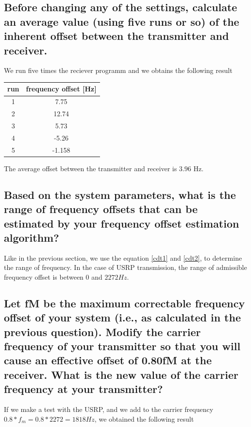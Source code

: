 \documentclass[frenchb, oneside, headings=normal]{scrartcl}
\begin{document}
\subsection{Before changing any of the settings, calculate an average value (using five runs or so) of the inherent offset between the transmitter and receiver.}

We run five times the reciever programm and we obtains the following result 
\begin{center}
	\begin{tabular}{c|c}
		run & frequency offset [\si{\hertz}]\\
		\hline
		1 & 7.75\\
		2 & 12.74\\
		3 & 5.73\\
		4 & -5.26\\
		5 & -1.158\\
	\end{tabular}
\end{center}
The average offset between the transmitter and receiver is $3.96$ \si{\hertz}. 


\subsection{Based on the system parameters, what is the range of frequency offsets that can be estimated by your frequency offset estimation algorithm?}

Like in the previous section, we use the equation \ref{cdt1} and \ref{cdt2}, to determine the range of frequency. In the case of USRP transmission, the range of admissible frequency offset is between $0$ and $2272 Hz$.

\newpage

\subsection{Let fM be the maximum correctable frequency offset of your system (i.e., as calculated in the previous question). Modify the carrier frequency of your transmitter so that you will cause an effective offset of 0.80fM at the receiver. What is the new value of the carrier frequency at your transmitter?}

If we make a test with the USRP, and we add to the carrier frequency $0.8*f_m=0.8*2272=1818 Hz$, we obtained the following result
\end{document}
